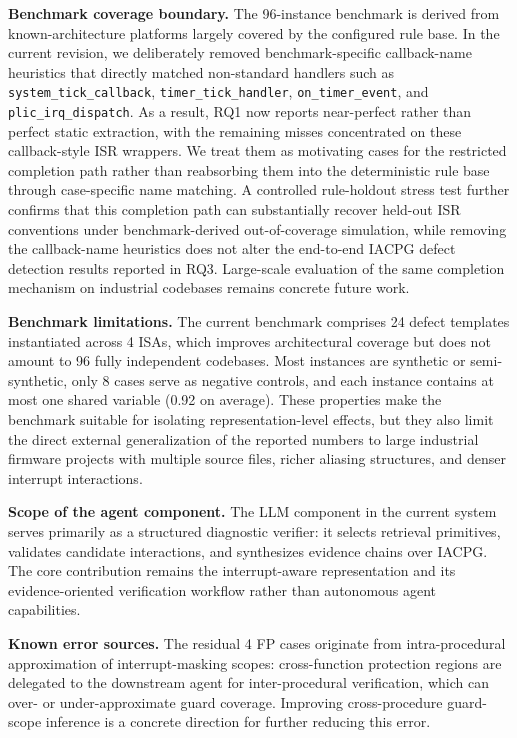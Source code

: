 \documentclass[a4paper,UKenglish,cleveref, autoref, thm-restate]{lipics-v2021}
\begin{document}
\textbf{Benchmark coverage boundary.} The 96-instance benchmark is derived from known-architecture platforms largely covered by the configured rule base. In the current revision, we deliberately removed benchmark-specific callback-name heuristics that directly matched non-standard handlers such as \texttt{system\_tick\_callback}, \texttt{timer\_tick\_handler}, \texttt{on\_timer\_event}, and \texttt{plic\_irq\_dispatch}. As a result, RQ1 now reports near-perfect rather than perfect static extraction, with the remaining misses concentrated on these callback-style ISR wrappers. We treat them as motivating cases for the restricted completion path rather than reabsorbing them into the deterministic rule base through case-specific name matching. A controlled rule-holdout stress test further confirms that this completion path can substantially recover held-out ISR conventions under benchmark-derived out-of-coverage simulation, while removing the callback-name heuristics does not alter the end-to-end IACPG defect detection results reported in RQ3. Large-scale evaluation of the same completion mechanism on industrial codebases remains concrete future work.

\textbf{Benchmark limitations.} The current benchmark comprises 24 defect templates instantiated across 4 ISAs, which improves architectural coverage but does not amount to 96 fully independent codebases. Most instances are synthetic or semi-synthetic, only 8 cases serve as negative controls, and each instance contains at most one shared variable (0.92 on average). These properties make the benchmark suitable for isolating representation-level effects, but they also limit the direct external generalization of the reported numbers to large industrial firmware projects with multiple source files, richer aliasing structures, and denser interrupt interactions.

\textbf{Scope of the agent component.} The LLM component in the current system serves primarily as a structured diagnostic verifier: it selects retrieval primitives, validates candidate interactions, and synthesizes evidence chains over IACPG. The core contribution remains the interrupt-aware representation and its evidence-oriented verification workflow rather than autonomous agent capabilities.

\textbf{Known error sources.} The residual 4 FP cases originate from intra-procedural approximation of interrupt-masking scopes: cross-function protection regions are delegated to the downstream agent for inter-procedural verification, which can over- or under-approximate guard coverage. Improving cross-procedure guard-scope inference is a concrete direction for further reducing this error.
\end{document}
